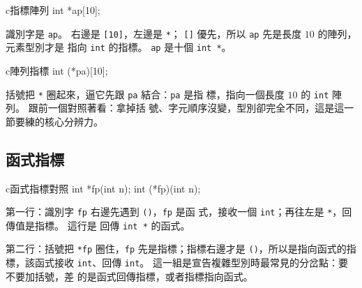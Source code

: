 \begin{code}{c}{指標陣列}
int *ap[10];
\end{code}

識別字是 \texttt{ap}。 右邊是 \texttt{[10]}，左邊是 \texttt{*}；
\texttt{[]} 優先，所以 \texttt{ap} 先是長度 $10$ 的陣列，元素型別才是
指向 \texttt{int} 的指標。 \texttt{ap} 是十個 \texttt{int *}。

\begin{center}
\label{fig:ch13-spiral-ap}
\end{center}

\begin{code}{c}{陣列指標}
int (*pa)[10];
\end{code}

括號把 \texttt{*} 圈起來，逼它先跟 \texttt{pa} 結合：\texttt{pa} 是指
標，指向一個長度 $10$ 的 \texttt{int} 陣列。 跟前一個對照著看：拿掉括
號、字元順序沒變，型別卻完全不同，這是這一節要練的核心分辨力。

\subsection{函式指標}

\begin{code}{c}{函式指標對照}
int *fp(int n);
int (*fp)(int n);
\end{code}

第一行：識別字 \texttt{fp} 右邊先遇到 \texttt{()}，\texttt{fp} 是函
式，接收一個 \texttt{int}；再往左是 \texttt{*}，回傳值是指標。 這行是
回傳 \texttt{int *} 的函式。

第二行：括號把 \texttt{*fp} 圈住，\texttt{fp} 先是指標；指標右邊才是
\texttt{()}，所以是指向函式的指標，該函式接收 \texttt{int}、回傳
\texttt{int}。 這一組是宣告複雜型別時最常見的分岔點：要不要加括號，差
的是函式回傳指標，或者指標指向函式。

